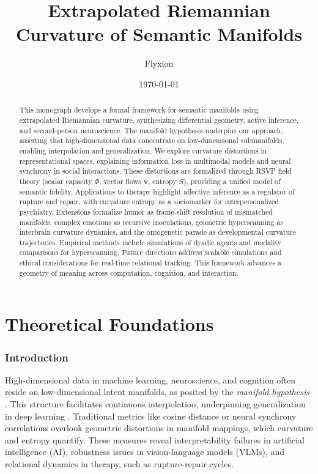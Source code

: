 \documentclass{article}
\title{Extrapolated Riemannian Curvature of Semantic Manifolds}
\author{Flyxion}
\date{\today}
\theoremstyle{definition}
\begin{document}
\maketitle

\begin{abstract}
This monograph develops a formal framework for semantic manifolds using extrapolated Riemannian curvature, synthesizing differential geometry, active inference, and second-person neuroscience. The manifold hypothesis underpins our approach, asserting that high-dimensional data concentrate on low-dimensional submanifolds, enabling interpolation and generalization. We explore curvature distortions in representational spaces, explaining information loss in multimodal models and neural synchrony in social interactions. These distortions are formalized through RSVP field theory (scalar capacity $\Phi$, vector flows $\mathbf{v}$, entropy $S$), providing a unified model of semantic fidelity. Applications to therapy highlight affective inference as a regulator of rupture and repair, with curvature entropy as a sociomarker for interpersonalized psychiatry. Extensions formalize humor as frame-shift resolution of mismatched manifolds, complex emotions as recursive inoculations, geometric hyperscanning as interbrain curvature dynamics, and the ontogenetic parade as developmental curvature trajectories. Empirical methods include simulations of dyadic agents and modality comparisons for hyperscanning. Future directions address scalable simulations and ethical considerations for real-time relational tracking. This framework advances a geometry of meaning across computation, cognition, and interaction.
\end{abstract}

\tableofcontents

\part{Theoretical Foundations}

\section{Introduction}
High-dimensional data in machine learning, neuroscience, and cognition often reside on low-dimensional latent manifolds, as posited by the \emph{manifold hypothesis} \cite{fefferman2016testing,gorban2018blessing,olah2014blog,cayton2005algorithms}. This structure facilitates continuous interpolation, underpinning generalization in deep learning \cite{chollet2021deep}. Traditional metrics like cosine distance or neural synchrony correlations overlook geometric distortions in manifold mappings, which curvature and entropy quantify. These measures reveal interpretability failures in artificial intelligence (AI), robustness issues in vision-language models (VLMs), and relational dynamics in therapy, such as rupture-repair cycles.
\end{document}
